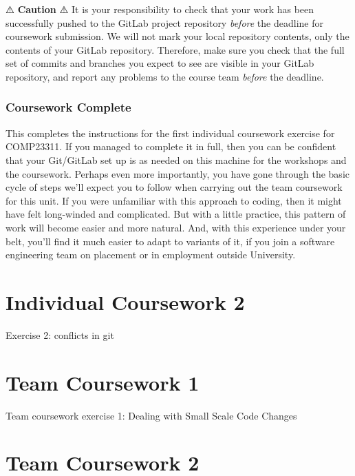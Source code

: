 \documentclass[
]{book}
\begin{document}
⚠️ \textbf{Caution} ⚠️
It is your responsibility to check that your work has been successfully pushed to the GitLab project repository \emph{before} the deadline for coursework submission. We will not mark your local repository contents, only the contents of your GitLab repository. Therefore, make sure you check that the full set of commits and branches you expect to see are visible in your GitLab repository, and report any problems to the course team \emph{before} the deadline.

\hypertarget{gameover}{%
\subsection{Coursework Complete}\label{gameover}}

This completes the instructions for the first individual coursework exercise for COMP23311. If you managed to complete it in full, then you can be confident that your Git/GitLab set up is as needed on this machine for the workshops and the coursework. Perhaps even more importantly, you have gone through the basic cycle of steps we'll expect you to follow when carrying out the team coursework for this unit. If you were unfamiliar with this approach to coding, then it might have felt long-winded and complicated. But with a little practice, this pattern of work will become easier and more natural. And, with this experience under your belt, you'll find it much easier to adapt to variants of it, if you join a software engineering team on placement or in employment outside University.

\hypertarget{conflicting}{%
\chapter{Individual Coursework 2}\label{conflicting}}

Exercise 2: conflicts in git

\hypertarget{dealing}{%
\chapter{Team Coursework 1}\label{dealing}}

Team coursework exercise 1: Dealing with Small Scale Code Changes

\hypertarget{working}{%
\chapter{Team Coursework 2}\label{working}}
\end{document}
